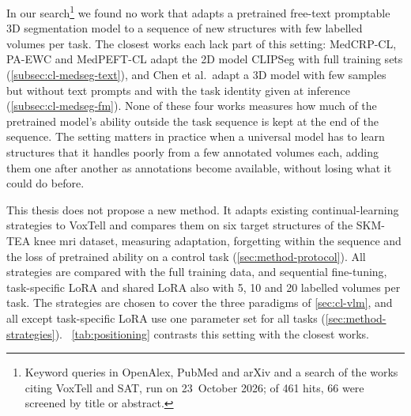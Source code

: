 In our search\footnote{Keyword queries in OpenAlex, PubMed and arXiv and a search of the works citing VoxTell and SAT, run on 23~October 2026; of 461 hits, 66 were screened by title or abstract.} we found no work that adapts a pretrained free-text promptable 3D segmentation model to a sequence of new structures with few labelled volumes per task.
The closest works each lack part of this setting: MedCRP-CL, PA-EWC and MedPEFT-CL adapt the 2D model CLIPSeg with full training sets (\cref{subsec:cl-medseg-text}), and Chen et al.\ adapt a 3D model with few samples but without text prompts and with the task identity given at inference (\cref{subsec:cl-medseg-fm}).
None of these four works measures how much of the pretrained model's ability outside the task sequence is kept at the end of the sequence.
The setting matters in practice when a universal model has to learn structures that it handles poorly from a few annotated volumes each, adding them one after another as annotations become available, without losing what it could do before.

This thesis does not propose a new method.
It adapts existing continual-learning strategies to VoxTell and compares them on six target structures of the SKM-TEA knee \gls{mri} dataset, measuring adaptation, forgetting within the sequence and the loss of pretrained ability on a control task (\cref{sec:method-protocol}).
All strategies are compared with the full training data, and sequential fine-tuning, task-specific LoRA and shared LoRA also with 5, 10 and 20 labelled volumes per task.
The strategies are chosen to cover the three paradigms of \cref{sec:cl-vlm}, and all except task-specific LoRA use one parameter set for all tasks (\cref{sec:method-strategies}).
\tablename~\ref{tab:positioning} contrasts this setting with the closest works.



